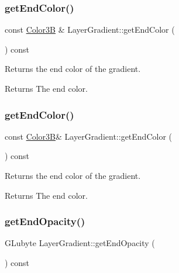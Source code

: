 \subsubsection{\texorpdfstring{get\+End\+Color()}{getEndColor()}\hspace{0.1cm}{\footnotesize\ttfamily [1/2]}}
{\footnotesize\ttfamily const \hyperlink{structColor3B}{Color3B} \& Layer\+Gradient\+::get\+End\+Color (\begin{DoxyParamCaption}{ }\end{DoxyParamCaption}) const}

Returns the end color of the gradient.

\begin{DoxyReturn}{Returns}
The end color. 
\end{DoxyReturn}
\mbox{\label{classLayerGradient_a01bd7bd9de3a530846188d0ec7e73375}} 
\subsubsection{\texorpdfstring{get\+End\+Color()}{getEndColor()}\hspace{0.1cm}{\footnotesize\ttfamily [2/2]}}
{\footnotesize\ttfamily const \hyperlink{structColor3B}{Color3B}\& Layer\+Gradient\+::get\+End\+Color (\begin{DoxyParamCaption}{ }\end{DoxyParamCaption}) const}

Returns the end color of the gradient.

\begin{DoxyReturn}{Returns}
The end color. 
\end{DoxyReturn}
\mbox{\label{classLayerGradient_a2045011cab0c21177dcc93408c1e5c23}} 
\subsubsection{\texorpdfstring{get\+End\+Opacity()}{getEndOpacity()}\hspace{0.1cm}{\footnotesize\ttfamily [1/2]}}
{\footnotesize\ttfamily G\+Lubyte Layer\+Gradient\+::get\+End\+Opacity (\begin{DoxyParamCaption}{ }\end{DoxyParamCaption}) const}

